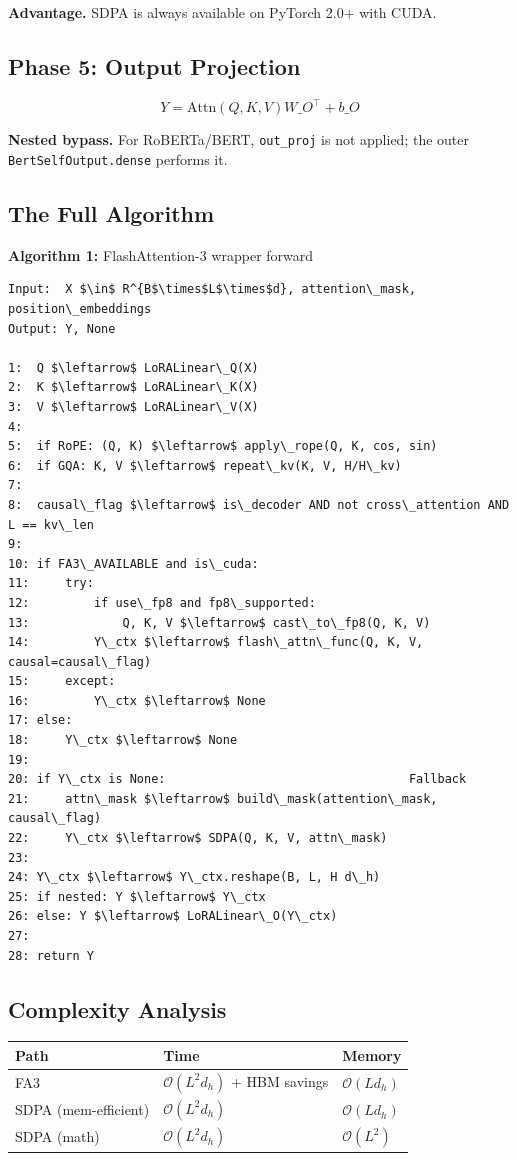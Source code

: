 \textbf{Advantage.} SDPA is always available on PyTorch 2.0+ with CUDA.

\subsection{Phase 5: Output Projection}

\[
Y = \text{Attn}(Q, K, V) W\_O^\top + b\_O
\tag{4.4}
\]

\textbf{Nested bypass.} For RoBERTa/BERT, \texttt{out\_proj} is not applied; the outer 
\texttt{BertSelfOutput.dense} performs it.

\subsection{The Full Algorithm}

\textbf{Algorithm 1:} FlashAttention-3 wrapper forward
\begin{lstlisting}
Input:  X $\in$ R^{B$\times$L$\times$d}, attention\_mask, position\_embeddings
Output: Y, None

1:  Q $\leftarrow$ LoRALinear\_Q(X)
2:  K $\leftarrow$ LoRALinear\_K(X)
3:  V $\leftarrow$ LoRALinear\_V(X)
4:
5:  if RoPE: (Q, K) $\leftarrow$ apply\_rope(Q, K, cos, sin)
6:  if GQA: K, V $\leftarrow$ repeat\_kv(K, V, H/H\_kv)
7:
8:  causal\_flag $\leftarrow$ is\_decoder AND not cross\_attention AND L == kv\_len
9:
10: if FA3\_AVAILABLE and is\_cuda:
11:     try:
12:         if use\_fp8 and fp8\_supported:
13:             Q, K, V $\leftarrow$ cast\_to\_fp8(Q, K, V)
14:         Y\_ctx $\leftarrow$ flash\_attn\_func(Q, K, V, causal=causal\_flag)
15:     except:
16:         Y\_ctx $\leftarrow$ None
17: else:
18:     Y\_ctx $\leftarrow$ None
19:
20: if Y\_ctx is None:                                  Fallback
21:     attn\_mask $\leftarrow$ build\_mask(attention\_mask, causal\_flag)
22:     Y\_ctx $\leftarrow$ SDPA(Q, K, V, attn\_mask)
23:
24: Y\_ctx $\leftarrow$ Y\_ctx.reshape(B, L, H d\_h)
25: if nested: Y $\leftarrow$ Y\_ctx
26: else: Y $\leftarrow$ LoRALinear\_O(Y\_ctx)
27:
28: return Y
\end{lstlisting}

\subsection{Complexity Analysis}

\begin{table}[H]
\centering
\small
\begin{tabular}{lll}
\toprule
\textbf{Path} & \textbf{Time} & \textbf{Memory} \\
\midrule
FA3 & $\mathcal{O}(L^2 d_h)$ + HBM savings & $\mathcal{O}(L d_h)$ \\
SDPA (mem-efficient) & $\mathcal{O}(L^2 d_h)$ & $\mathcal{O}(L d_h)$ \\
SDPA (math) & $\mathcal{O}(L^2 d_h)$ & $\mathcal{O}(L^2)$ \\
\bottomrule
\end{tabular}
\end{table}

